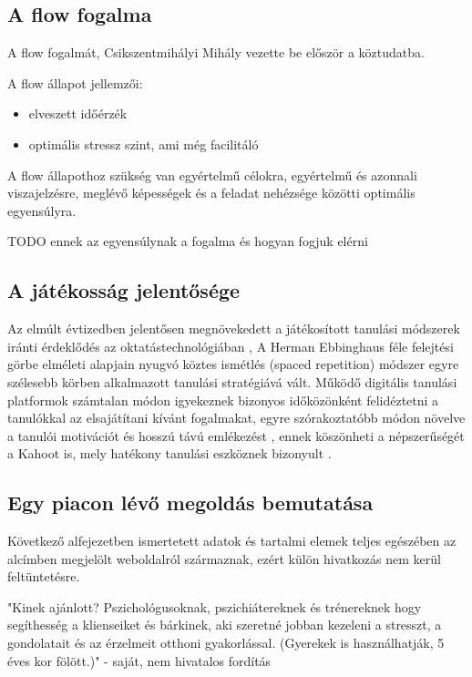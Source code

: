 \subsection{A flow fogalma}

A flow fogalmát, Csikszentmihályi Mihály vezette be először a köztudatba. 

A flow állapot jellemzői:
\begin{itemize}
    \item elveszett időérzék
    \item optimális stressz szint, ami még facilitáló
\end{itemize}

A flow állapothoz szükség van egyértelmű célokra, egyértelmű és azonnali viszajelzésre, meglévő képességek és a feladat nehézsége közötti optimális egyensúlyra. 


TODO ennek az egyensúlynak a fogalma és hogyan fogjuk elérni


\subsection{A játékosság jelentősége} 



Az elmúlt évtizedben jelentősen megnövekedett a játékosított tanulási módszerek iránti érdeklődés az oktatástechnológiában \cite{GAMIFICATION}, A Herman Ebbinghaus féle felejtési görbe  elméleti alapjain nyugvó köztes ismétlés (spaced repetition) módszer egyre szélesebb körben alkalmazott tanulási stratégiává vált. Működő digitális tanulási platformok számtalan módon igyekeznek bizonyos időközönként felidéztetni a tanulókkal az elsajátítani kívánt fogalmakat, egyre szórakoztatóbb módon növelve a tanulói motivációt \cite{GAMIFICATION} és hosszú távú emlékezést \cite{SPACED-REPETITION}, ennek köszönheti a népszerűségét a Kahoot is, mely hatékony tanulási eszköznek bizonyult \cite{KAHOOT}. 


\subsection{Egy piacon lévő megoldás bemutatása\texorpdfstring{ \cite{biofeedbacklabsRegainEnergy}}{}}

Következő alfejezetben ismertetett adatok és tartalmi elemek teljes egészében az alcímben megjelölt weboldalról származnak, ezért külön hivatkozás nem kerül feltüntetésre.

"Kinek ajánlott?
Pszichológusoknak, pszichiátereknek és trénereknek hogy segíthesség a klienseiket és bárkinek, aki szeretné jobban kezeleni a stresszt, a gondolatait és az érzelmeit otthoni gyakorlással. (Gyerekek is használhatják, 5 éves kor fölött.)" - saját, nem hivatalos fordítás

